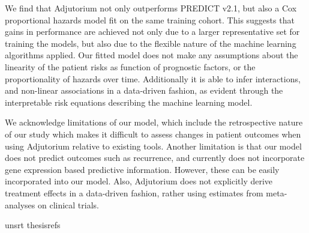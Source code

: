 \documentclass [PhD] {uclathes}
\begin{document}
We find that Adjutorium not only outperforms PREDICT v2.1, but also a Cox proportional hazards model fit on the same training cohort. This suggests that gains in performance are achieved not only due to a larger representative set for training the models, but also due to the flexible nature of the machine learning algorithms applied. Our fitted model does not make any assumptions about the linearity of the patient risks as function of prognostic factors, or the proportionality of hazards over time. Additionally it is able to infer interactions, and non-linear associations in a data-driven fashion, as evident through the interpretable risk equations describing the machine learning model. 

We acknowledge limitations of our model, which include the retrospective nature of our study which makes it difficult to assess changes in patient outcomes when using Adjutorium relative to existing tools. Another limitation is that our model does not predict outcomes such as recurrence, and currently does not incorporate gene expression based predictive information. However, these can be easily incorporated into our model. Also, Adjutorium does not explicitly derive treatment effects in a data-driven fashion, rather using estimates from meta-analyses on clinical trials. 



 {unsrt} %
 {thesisrefs}    %
\end{document}
